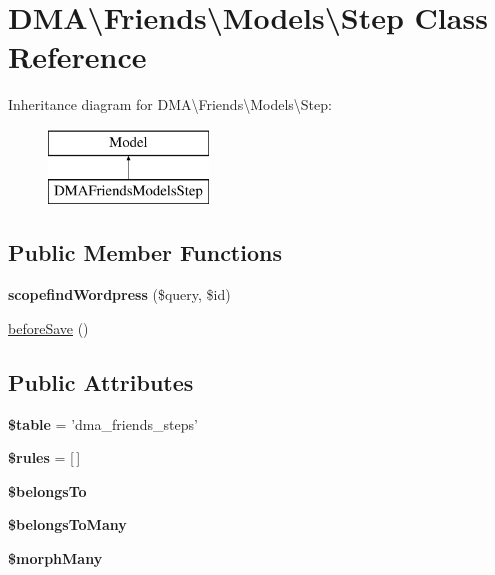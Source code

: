 \hypertarget{classDMA_1_1Friends_1_1Models_1_1Step}{\section{D\+M\+A\textbackslash{}Friends\textbackslash{}Models\textbackslash{}Step Class Reference}
\label{classDMA_1_1Friends_1_1Models_1_1Step}
}
Inheritance diagram for D\+M\+A\textbackslash{}Friends\textbackslash{}Models\textbackslash{}Step\+:\begin{figure}[H]
\begin{center}
\leavevmode
\includegraphics[height=2.000000cm]{d9/d03/classDMA_1_1Friends_1_1Models_1_1Step}
\end{center}
\end{figure}
\subsection*{Public Member Functions}
\begin{DoxyCompactItemize}
\item 
\hypertarget{classDMA_1_1Friends_1_1Models_1_1Step_a58a71b1c9b39249ac24484bbd2307db2}{{\bfseries scopefind\+Wordpress} (\$query, \$id)}\label{classDMA_1_1Friends_1_1Models_1_1Step_a58a71b1c9b39249ac24484bbd2307db2}

\item 
\hyperlink{classDMA_1_1Friends_1_1Models_1_1Step_abed223d05f52e5e39b0991929695cee9}{before\+Save} ()
\end{DoxyCompactItemize}
\subsection*{Public Attributes}
\begin{DoxyCompactItemize}
\item 
\hypertarget{classDMA_1_1Friends_1_1Models_1_1Step_a73a0d48cb46b1aeeaad83499e8449acc}{{\bfseries \$table} = 'dma\+\_\+friends\+\_\+steps'}\label{classDMA_1_1Friends_1_1Models_1_1Step_a73a0d48cb46b1aeeaad83499e8449acc}

\item 
\hypertarget{classDMA_1_1Friends_1_1Models_1_1Step_a13476d5ca718080b85c9633270bf4942}{{\bfseries \$rules} = \mbox{[}$\,$\mbox{]}}\label{classDMA_1_1Friends_1_1Models_1_1Step_a13476d5ca718080b85c9633270bf4942}

\item 
{\bfseries \$belongs\+To}
\item 
{\bfseries \$belongs\+To\+Many}
\item 
{\bfseries \$morph\+Many}
\end{DoxyCompactItemize}
